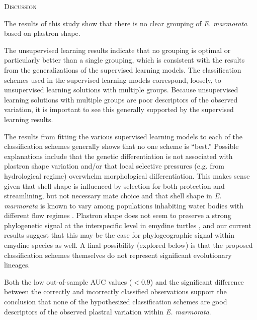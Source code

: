 \documentclass[12pt,letterpaper]{article}
\renewcommand{\section}[1]{%
\bigskip
\begin{center}
\begin{Large}
\normalfont\scshape #1
\medskip
\end{Large}
\end{center}}
\begin{document}
\section{Discussion}

The results of this study show that there is no clear grouping of \textit{E. marmorata} based on plastron shape.

The unsupervised learning results indicate that no grouping is optimal or particularly better than a single grouping, which is consistent with the results from the generalizations of the supervised learning models. The classification schemes used in the supervised learning models correspond, loosely, to unsupervised learning solutions with multiple groups. Because unsupervised learning solutions with multiple groups are poor descriptors of the observed variation, it is important to see this generally supported by the supervised learning results.

The results from fitting the various supervised learning models to each of the classification schemes generally shows that no one scheme is ``best.'' Possible explanations include that the genetic differentiation is not associated with plastron shape variation and/or that local selective pressures (e.g. from hydrological regime) overwhelm morphological differentiation. This makes sense given that shell shape is influenced by selection for both protection and streamlining, but not necessary mate choice \citep{Rivera2008,Rivera2011,Stayton2011,Rivera2014,Pollyb} and that shell shape in \textit{E. marmorata} is known to vary among populations inhabiting water bodies with different flow regimes \citep{Holland1992,Lubcke2007,Germano2009}. Plastron shape does not seem to preserve a strong phylogenetic signal at the interspecific level in emydine turtles \citep{Angielczyk2011}, and our current results suggest that this may be the case for phylogeographic signal within emydine species as well. A final possibility (explored below) is that the proposed classification schemes themselves do not represent significant evolutionary lineages.

Both the low out-of-sample AUC values (\(< 0.9\)) and the significant difference between the correctly and incorrectly classified observations support the conclusion that none of the hypothesized classification schemes are good descriptors of the observed plastral variation within \textit{E. marmorata}.
\end{document}
